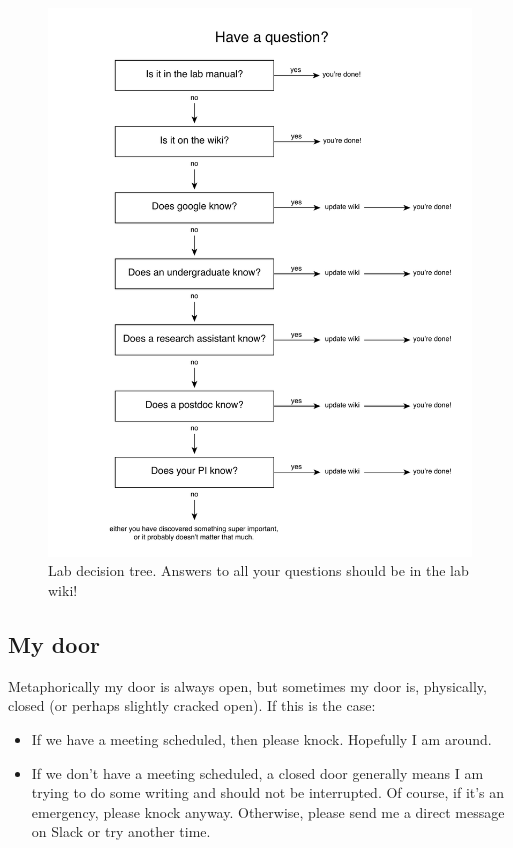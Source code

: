 \documentclass[letterpaper,11pt,oneside]{memoir}
\begin{document}
\begin{figure}
\label{fig:decisiontree}
\includegraphics[width=\textwidth]{figures/lab_decision_tree.pdf}
\caption{Lab decision tree. Answers to all your questions should be in the lab wiki!}
\end{figure}

\subsection{My door}
Metaphorically my door is always open, but sometimes my door is, physically, closed (or perhaps slightly cracked open). If this is the case:

\begin{itemize}
\item If we have a meeting scheduled, then please knock. Hopefully I am around.
\item If we don't have a meeting scheduled, a closed door generally means I am trying to do some writing and should not be interrupted. Of course, if it's an emergency, please knock anyway. Otherwise, please send me a direct message on Slack or try another time.
\end{itemize}
\end{document}
